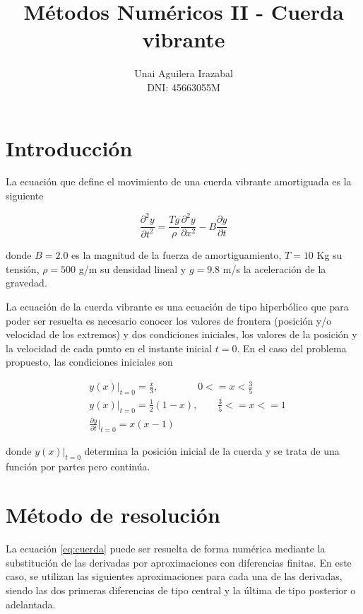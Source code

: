 \documentclass[11pt]{article}
\title{Métodos Numéricos II - Cuerda vibrante}
\author{Unai Aguilera Irazabal\\ DNI: 45663055M}
\begin{document}
\maketitle
\tableofcontents

\pagebreak
\renewcommand{\tablename}{Tabla}

\section{Introducción}
La ecuación que define el movimiento de una cuerda vibrante amortiguada es la siguiente

\begin{equation}
\frac{\partial^2 y}{\partial{t^2}} = \frac{Tg}{\rho}\frac{\partial^2 y}{\partial{x^2}} 
	- B\frac{\partial y}{\partial{t}}
\label{eq:cuerda}
\end{equation}

donde $B=2.0$ es la magnitud de la fuerza de amortiguamiento, $T=10$ Kg su tensión,
$\rho = 500$ g/m su densidad lineal y $g = 9.8$ m/s la aceleración de la gravedad. 

La ecuación de la cuerda vibrante es una ecuación de tipo hiperbólico que para poder ser
resuelta es necesario conocer los valores de frontera (posición y/o velocidad de los extremos) y
dos condiciones iniciales, los valores de la posición y la velocidad de cada punto en el instante
inicial $t=0$.
En el caso del problema propuesto, las condiciones iniciales son

\begin{subequations}
\begin{flalign}
	&y(x)|_{t=0} = \frac{x}{3},~~~~~~~~~~~~~~~~~~ 0 <= x < \frac{3}{5}\\
	&y(x)|_{t=0} = \frac{1}{2}(1 - x),~~~~~~~~~ \frac{3}{5} <= x <= 1\\
	&\frac{\partial{y}}{\partial{t}}|_{t=0} = x(x-1)
\end{flalign}
\label{eq:condiciones_iniciales}
\end{subequations}

donde $y(x)|_{t=0}$ determina la posición inicial de la cuerda y se trata de una función
por partes pero continúa.

\section{Método de resolución}
La ecuación \eqref{eq:cuerda} puede ser resuelta de forma numérica mediante la substitución
de las derivadas por aproximaciones con diferencias finitas. En este caso, se utilizan las
siguientes aproximaciones para cada una de las derivadas, siendo las dos primeras
diferencias de tipo central y la última de tipo posterior o adelantada.
\end{document}

